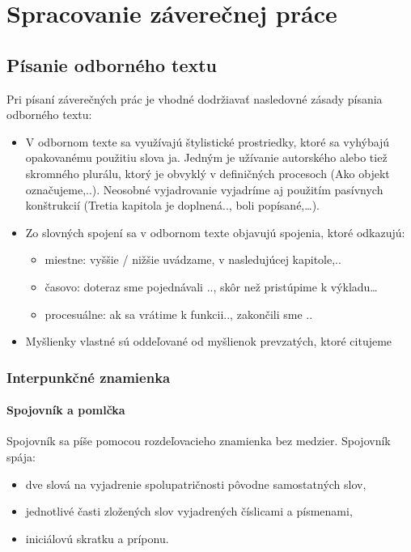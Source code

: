 \section{Spracovanie záverečnej práce}

\subsection{Písanie odborného textu}

Pri písaní záverečných prác je vhodné dodržiavať nasledovné zásady písania odborného textu: 

\begin{itemize}
	\item V odbornom texte sa využívajú štylistické prostriedky, ktoré sa vyhýbajú opakovanému použitiu slova ja. Jedným je užívanie autorského alebo tiež skromného plurálu, ktorý je obvyklý v definičných procesoch (Ako objekt označujeme,..). Neosobné vyjadrovanie vyjadríme aj použitím pasívnych konštrukcií (Tretia kapitola je doplnená.., boli popísané,…).
	\item Zo slovných spojení sa v odbornom texte objavujú spojenia, ktoré odkazujú:
	\begin{itemize}
		\item miestne: vyššie / nižšie uvádzame, v nasledujúcej kapitole,..
		\item časovo: doteraz sme pojednávali .., skôr než pristúpime k výkladu…
		\item procesuálne: ak sa vrátime k funkcii.., zakončili sme ..
	\end{itemize}
	\item Myšlienky vlastné sú oddeľované od myšlienok prevzatých, ktoré citujeme
\end{itemize}

\subsubsection{Interpunkčné znamienka}

\paragraph{Spojovník a pomlčka}

Spojovník sa píše pomocou rozdeľovacieho znamienka bez medzier. Spojovník spája:

\begin{itemize}
	\item dve slová na vyjadrenie spolupatričnosti pôvodne samostatných slov, 
	\item jednotlivé časti zložených slov vyjadrených číslicami a písmenami,
	\item iniciálovú skratku a príponu. 
\end{itemize}

